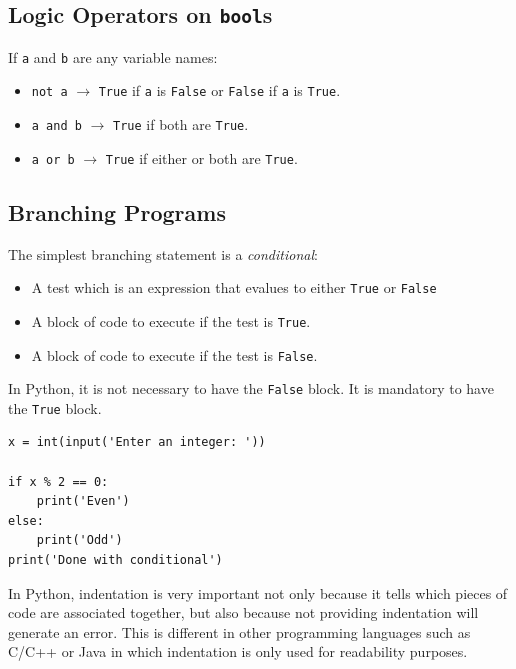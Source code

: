 \documentclass[a4paper]{article}
\newcommand{\inlinecode}{\texttt}
\begin{document}
\subsection{Logic Operators on \inlinecode{bool}s}

If \inlinecode{a} and \inlinecode{b} are any variable names:

\begin{itemize}
  \item \inlinecode{not a} $\longrightarrow$ \inlinecode{True} if
        \inlinecode{a} is \inlinecode{False} or \inlinecode{False} if
        \inlinecode{a} is \inlinecode{True}.
  \item \inlinecode{a and b} $\longrightarrow$ \inlinecode{True} if both are
        \inlinecode{True}.
  \item \inlinecode{a or b} $\longrightarrow$ \inlinecode{True} if either or
        both are \inlinecode{True}.
\end{itemize}

\subsection{Branching Programs}

The simplest branching statement is a \textit{conditional}:

\begin{itemize}
  \item A test which is an expression that evalues to either \inlinecode{True}
  or \inlinecode{False}
  \item A block of code to execute if the test is \inlinecode{True}.
  \item A block of code to execute if the test is \inlinecode{False}.
\end{itemize}

In Python, it is not necessary to have the \inlinecode{False} block. It is
mandatory to have the \inlinecode{True} block.

\begin{lstlisting}
x = int(input('Enter an integer: '))

if x % 2 == 0:
    print('Even')
else:
    print('Odd')
print('Done with conditional')
\end{lstlisting}

In Python, indentation is very important not only because it tells which pieces
of code are associated together, but also because not providing indentation
will generate an error. This is different in other programming languages such
as C/C++ or Java in which indentation is only used for readability purposes.
\end{document}
